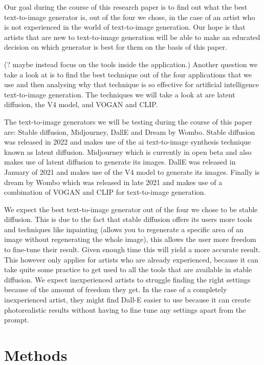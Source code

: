 \documentclass[]{report}
\begin{document}
Our goal during the course of this research paper is to find out what the best text-to-image generator is, out of the four we chose, in the case of an artist who is not experienced in the world of text-to-image generation. Our hope is that artists that are new to text-to-image generation will be able to make an educated decision on which generator is best for them on the basis of this paper.

(? maybe instead focus on the tools inside the application.) Another question we take a look at is to find the best technique out of the four applications that we use and then analysing why that technique is so effective for artificial intelligence text-to-image generation. The techniques we will take a look at are latent diffusion, the V4 model, and VOGAN and CLIP.

The text-to-image generators we will be testing during the course of this paper are: Stable diffusion, Midjourney, DallE and Dream by Wombo. Stable diffusion was released in 2022 and makes use of the ai text-to-image synthesis technique known as latent diffusion. Midjourney which is currently in open beta and also makes use of latent diffusion to generate its images. DallE was released in January of 2021 and makes use of the V4 model to generate its images. Finally is dream by Wombo which was released in late 2021 and makes use of a combination of VOGAN and CLIP for text-to-image generation.

We expect the best text-to-image generator out of the four we chose to be stable diffusion. This is due to the fact that stable diffusion offers its users more tools and techniques like inpainting (allows you to regenerate a specific area of an image without regenerating the whole image), this allows the user more freedom to fine-tune their result. Given enough time this will yield a more accurate result. This however only applies for artists who are already experienced, because it can take quite some practice to get used to all the tools that are available in stable diffusion. We expect inexperienced artists to struggle finding the right settings because of the amount of freedom they get. In the case of a completely inexperienced artist, they might find Dall-E easier to use because it can create photorealistic results without having to fine tune any settings apart from the prompt.
	

	
	\section{Methods}
	
\end{document}
